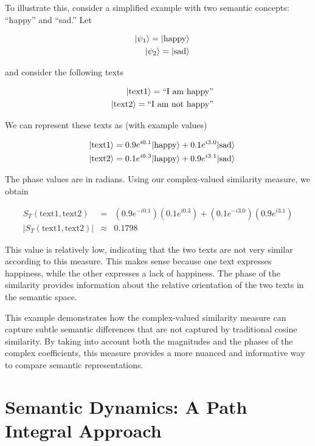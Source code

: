 \documentclass[prd,amsmath,amssymb,12pt]{revtex4}
\DeclarePairedDelimiter\ket{\lvert}{\rangle}
\begin{document}
To illustrate this, consider a simplified example with two semantic concepts: ``happy'' and ``sad.'' Let

\begin{eqnarray}
  &&\ket{\psi_1} = \ket{\text{happy}}\\
  &&\ket{\psi_2} = \ket{\text{sad}}
\end{eqnarray}

\noindent
and consider the following texts

\begin{eqnarray}
    &&\ket{\text{text1}} = \text{``I am happy''}\\
    &&\ket{\text{text2}} = \text{``I am not happy''}
\end{eqnarray}

\noindent
We can represent these texts as (with example values)

\begin{eqnarray}
    &&\ket{\text{text1}} = 0.9 e^{i0.1}\ket{\text{happy}} + 0.1 e^{i3.0}\ket{\text{sad}}\\
    &&\ket{\text{text2}} = 0.1 e^{i0.3}\ket{\text{happy}} + 0.9 e^{i3.1}\ket{\text{sad}}
\end{eqnarray}

\noindent
The phase values are in radians.
Using our complex-valued similarity measure, we obtain

\begin{eqnarray}
  S_T(\text{text1},\text{text2}) &=& (0.9 e^{-i0.1})(0.1 e^{i0.3}) + (0.1 e^{-i3.0})(0.9 e^{i3.1}) \\
  |S_T(\text{text1},\text{text2}) | &\approx& 0.1798
\end{eqnarray}

\noindent
This value is relatively low, indicating that the two texts are not very similar according to this measure.
This makes sense because one text expresses happiness, while the other expresses a lack of happiness.
The phase of the similarity provides information about the relative orientation of the two texts in the semantic space.

This example demonstrates how the complex-valued similarity measure can capture subtle semantic differences
that are not captured by traditional cosine similarity. By taking into account both the magnitudes and the
phases of the complex coefficients, this measure provides a more nuanced and informative way to compare semantic
representations.



\section{Semantic Dynamics: A Path Integral Approach}
\end{document}
